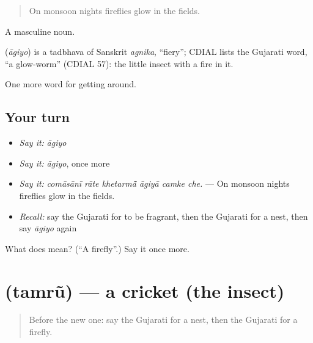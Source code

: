 \begin{quote}
On monsoon nights fireflies glow in the fields.
\end{quote}

A masculine noun.

\begin{cousinweb}
\textbf{} (\emph{āgiyo}) is a tadbhava of Sanskrit \emph{agnika}, \textquotedblleft{}fiery\textquotedblright{}; CDIAL lists the Gujarati word, \textquotedblleft{}a glow-worm\textquotedblright{} (CDIAL 57): the little insect with a fire in it.
\end{cousinweb}

\begin{grammarlens}[title={What you've built}]
One more word for getting around.
\end{grammarlens}

\subsection*{Your turn}
\begin{itemize}
\raggedright
  \item \emph{Say it:} \emph{āgiyo}
  \item \emph{Say it:} \emph{āgiyo}, once more
  \item \emph{Say it:} \emph{comāsānī rāte khetarmā̃ āgiyā camke che.} — On monsoon nights fireflies glow in the fields.
  \item \emph{Recall:} say the Gujarati for to be fragrant, then the Gujarati for a nest, then say \emph{āgiyo} again
\end{itemize}

\begin{tcolorbox}[breakable,colback=teal!4,colframe=teal!35!black,title={Before you move on}]
What does  mean? (\textquotedblleft{}A firefly\textquotedblright{}.) Say it once more.
\end{tcolorbox}
\section[\texorpdfstring{\gu{તમરું} (tamrũ)}{તમરું (tamrũ)}]{ (tamrũ) — a cricket (the insect)}

\label{lesson:GU-C445-tamru}



\begin{quote}
Before the new one: say the Gujarati for a nest, then the Gujarati for a firefly.
\end{quote}

